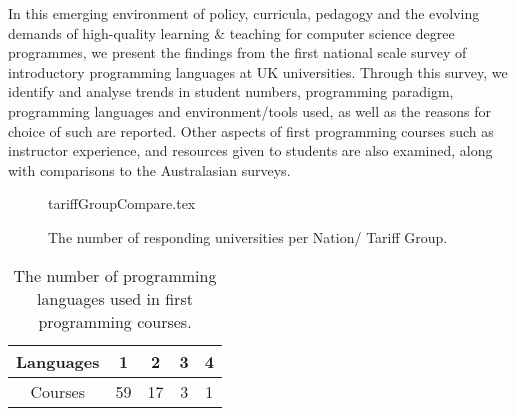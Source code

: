 \documentclass{sig-alternate}
\begin{document}
\iffalse
Alongside this increased scrutiny of standards and outputs for
computer science degrees in UK universities, a Teaching Excellence
Framework\footnote{\url{http://www.hefce.ac.uk/lt/tef/}} has been
proposed as part of proposed new higher education legislation. The
core ambition of the framework is ``to raise the quality and status of
teaching in higher education institutions''; excellence is to be
measured through a series of proxy metrics that include student
satisfaction, retention and graduate employability. There has been
significant concerns about the aims of the framework, as well as the
suitability of the metrics; more so in the context of it benchmarking
and creating leagues tables for ``teaching excellence'', as well as
deciding whether institutions are allowed to raise tuition fees in the
future. The UK's Higher Education Academy -- the national body which
champions teaching quality -- has previously supported initiatives for
improving learning \& teaching in computer science, including
innovative pedagogies for
programming~\cite{crick-et-al-hea:2015,davenport-et-al:latice2016},
but we have not seen the desired cascading of best practice and wider
national impact.
\fi 

In this emerging environment of policy, curricula, pedagogy and the
evolving demands of high-quality learning \& teaching for computer
science degree programmes, we present the findings from the first
national scale survey of introductory programming languages at UK
universities. Through this survey, we identify and analyse trends in
student numbers, programming paradigm, programming languages and
environment/tools used, as well as the reasons for choice of such are
reported. Other aspects of first programming courses such as
instructor experience, %
and resources
given to students are also examined, along with comparisons to the
 Australasian surveys.

\begin{figure}
\begin{center}
{tariffGroupCompare.tex}\vskip-12pt
\caption{The number of responding universities per Nation/   
 Tariff Group.\label{fig:TG}}
\end{center}
\end{figure}

\begin{table}[]
\centering
\caption{The number of programming languages used in first programming courses.}
\label{tab:numLanguages}
\begin{tabular}{ccccc}
\hline
Languages & 1  & 2  & 3 & 4 \\ \hline
Courses   & 59 & 17 & 3 & 1 \\ \hline
\end{tabular}
\end{table}
\end{document}
